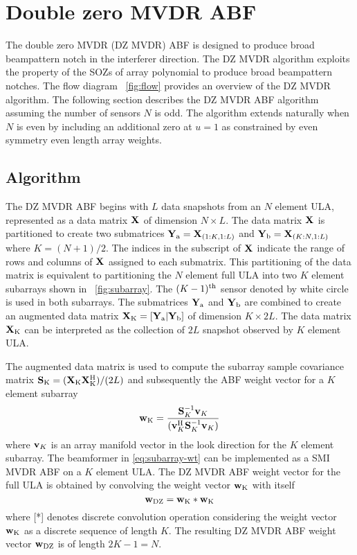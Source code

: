 \section{Double zero MVDR ABF}
\label{sec:double-zero-mvdr}
The double zero MVDR (DZ MVDR) ABF is designed to produce broad
beampattern notch in the interferer direction. The DZ MVDR algorithm
exploits the property of the SOZs of array polynomial to produce broad beampattern notches. The flow
diagram \figurename{}~\ref{fig:flow} provides an overview of the DZ
MVDR algorithm. The following section describes the DZ MVDR ABF
algorithm assuming the number of sensors $N$ is odd. The algorithm
extends naturally when $N$ is even by including an additional zero at
$u = 1$ as constrained by even symmetry even length array weights.

\subsection{Algorithm}
\label{sec:algorithm}
The DZ MVDR ABF begins with $L$ data snapshots from an $N$ element
ULA, represented as a data matrix $\mathbf{X}_{}$ of dimension
$N \times L$.  The data matrix $\mathbf{X}_{}$ is partitioned to create
two submatrices $\mathbf{Y}_{{\rm a}} = \mathbf{X}_{(1:K, 1:L)}$ and
$\mathbf{Y}_{\rm b} = \mathbf{X}_{(K:N, 1:L)}$ where $K = (N + 1)/2$. The
indices in the subscript of $\mathbf{X}_{}$ indicate the range of rows
and columns of $\mathbf{X}_{}$ assigned to each submatrix. This
partitioning of the data matrix is equivalent to partitioning the $N$
element full ULA into two $K$ element
subarrays shown in \figurename{}~\ref{fig:subarray}. The $(K-1)^{\rm th}$ sensor denoted by white circle is used in both subarrays. The submatrices $\mathbf{Y}_{{\rm a}}$ and
$\mathbf{Y}_{{\rm b}}$ are combined to create an augmented data matrix
$\mathbf{X}_{\rm K} = [\mathbf{Y}_{{\rm a}} | \mathbf{Y}_{{\rm b}}]$ of
dimension $K \times 2L$. The data matrix $\mathbf{X}_{\rm K}$ can be
interpreted as the collection of $2L$ snapshot observed by $K$ element
ULA.

The augmented data matrix is used to compute the subarray sample
covariance matrix
${\bf S}_{\rm K} = (\mathbf{X}_{\rm K}\mathbf{X}_{\rm K}^{\rm H})/(2L)$ and subsequently
the ABF weight vector for a $K$ element subarray
\begin{equation}
  \label{eq:subarray-wt}
  {\bf w}_{\rm K} = \frac{{\bf S}_{K}^{-1}{\bf v}_{K}}{({\bf v}_{K}^{\rm H} {\bf S}_{K}^{-1}{\bf v}_{K})}
\end{equation}
where ${\bf v}_{K}$ is an array manifold vector in the look direction for
the $K$ element subarray. The beamformer in \eqref{eq:subarray-wt} can
be implemented as a SMI MVDR ABF on a $K$ element ULA. The DZ MVDR ABF
weight vector for the full ULA is obtained by convolving the weight vector
${\bf w}_{\rm K}$ with itself
\begin{equation}
  \label{eq:wt-convo}
  {\bf w}_{\rm DZ} = {\bf w}_{\rm K}*{\bf w}_{\rm K}
\end{equation}
where [*] denotes discrete convolution operation considering the weight vector
${\bf w}_{\rm K}$ as a discrete sequence of length $K$. The resulting DZ MVDR ABF
weight vector ${\bf w}_{\rm DZ}$ is of length $2K - 1 = N$.


